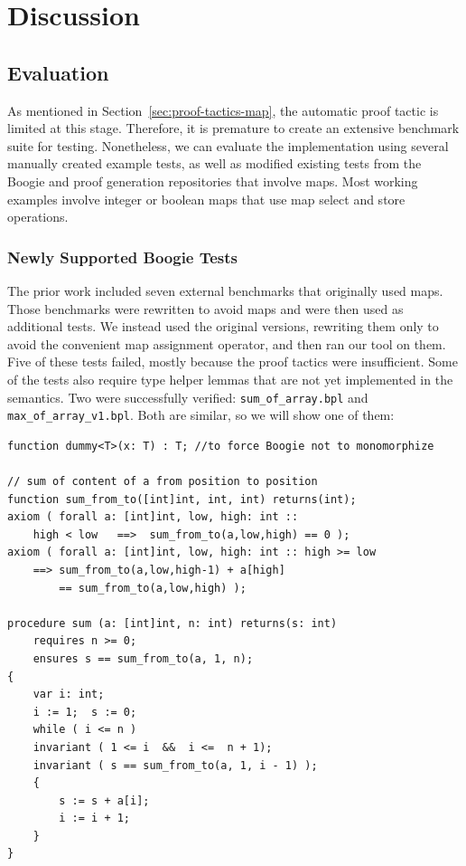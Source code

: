 \chapter{Discussion}
\label{sec:discussion}

\section{Evaluation}

As mentioned in Section~\ref{sec:proof-tactics-map},
the automatic proof tactic is limited at this stage.
Therefore, it is premature to create an extensive benchmark suite for testing.
Nonetheless, we can evaluate the implementation using several manually created example tests,
as well as modified existing tests from the Boogie and proof generation repositories that involve maps.
Most working examples involve integer or boolean maps
that use map select and store operations.


\subsection{Newly Supported Boogie Tests}

The prior work \cite{parthasarathy2021formally} included seven external benchmarks \cite{chen2017triggerless} that originally used maps.
Those benchmarks were rewritten to avoid maps and were then used as additional tests.
We instead used the original versions, rewriting them only to avoid the convenient map assignment operator,
and then ran our tool on them.
Five of these tests failed, mostly because the proof tactics were insufficient.
Some of the tests also require type helper lemmas that are not yet implemented in the semantics.
Two were successfully verified: \texttt{sum\_of\_array.bpl} and \texttt{max\_of\_array\_v1.bpl}.
Both are similar, so we will show one of them:

\begin{lstlisting}[caption={\texttt{sum\_of\_array.bpl}}]
function dummy<T>(x: T) : T; //to force Boogie not to monomorphize

// sum of content of a from position to position
function sum_from_to([int]int, int, int) returns(int);
axiom ( forall a: [int]int, low, high: int ::
    high < low   ==>  sum_from_to(a,low,high) == 0 );
axiom ( forall a: [int]int, low, high: int :: high >= low
    ==> sum_from_to(a,low,high-1) + a[high]
        == sum_from_to(a,low,high) );

procedure sum (a: [int]int, n: int) returns(s: int)
	requires n >= 0;
	ensures s == sum_from_to(a, 1, n);
{
	var i: int;
	i := 1;  s := 0;
	while ( i <= n )
	invariant ( 1 <= i  &&  i <=  n + 1);
	invariant ( s == sum_from_to(a, 1, i - 1) );
	{
		s := s + a[i];
		i := i + 1;
	}
}
\end{lstlisting}

